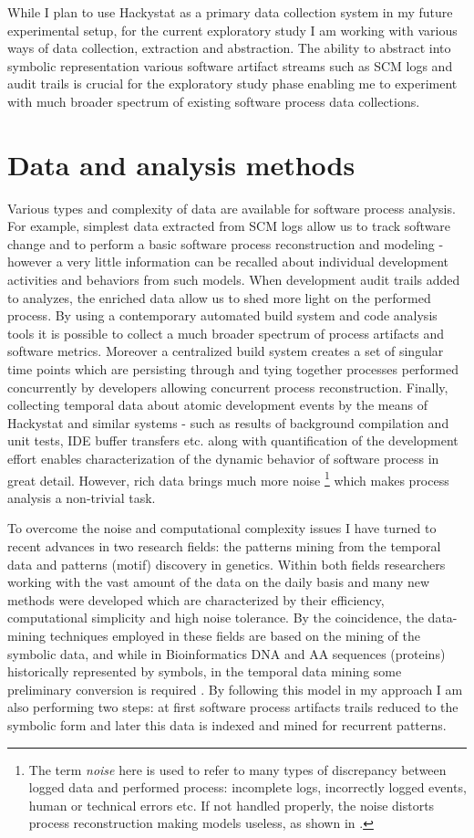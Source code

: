\documentclass{sig-alternate}
\begin{document}
While I plan to use Hackystat as a primary data collection system in my future experimental setup, for the current exploratory study I am working with various ways of data collection, extraction and abstraction. The ability to abstract into symbolic representation various software artifact streams such as SCM logs and audit trails is crucial for the exploratory study phase enabling me to experiment with much broader spectrum of existing software process data collections.

\section{Data and analysis methods}
Various types and complexity of data are available for software process analysis. For example, simplest data extracted from SCM logs allow us to track software change and to perform a basic software process reconstruction and modeling - however a very little information can be recalled about individual development activities and behaviors from such models. When development audit trails added to analyzes, the enriched data allow us to shed more light on the performed process. By using a contemporary automated build system and code analysis tools it is possible to collect a much broader spectrum of process artifacts and software metrics. Moreover a centralized build system creates a set of singular time points which are persisting through and tying together processes performed concurrently by developers allowing concurrent process reconstruction. Finally, collecting temporal data about atomic development events by the means of Hackystat and similar systems - such as results of background compilation and unit tests, IDE buffer transfers etc. along with quantification of the development effort enables characterization of the dynamic behavior of software process in great detail. However, rich data brings much more noise \footnote{The term \textit{noise} here is used to refer to many types of discrepancy between logged data and performed process: incomplete logs, incorrectly logged events, human or technical errors etc. If not handled properly, the noise distorts process reconstruction making models useless, as shown in \cite{citeulike:2678511}.} which makes process analysis a non-trivial task.  

To overcome the noise and computational complexity issues I have turned to recent advances in two research fields: the patterns mining from the temporal data and patterns (motif) discovery in genetics. Within both fields researchers working with the vast amount of the data on the daily basis and many new methods were developed which are characterized by their efficiency, computational simplicity and high noise tolerance. By the coincidence, the data-mining techniques employed in these fields are based on the mining of the symbolic data, and while in Bioinformatics DNA and AA sequences (proteins) historically represented by symbols, in the temporal data mining some preliminary conversion is required \cite{citeulike:2821475}. By following this model in my approach I am also performing two steps: at first software process artifacts trails reduced to the symbolic form and later this data is indexed and mined for recurrent patterns.
\end{document}
